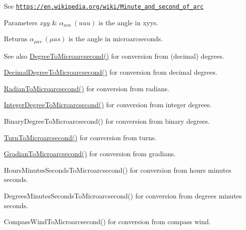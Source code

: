 See \href{https://en.wikipedia.org/wiki/Minute_and_second_of_arc}{\tt https\+://en.\+wikipedia.\+org/wiki/\+Minute\+\_\+and\+\_\+second\+\_\+of\+\_\+arc} 
\begin{DoxyParams}{Parameters}
{\em xyy} & $\alpha_{ava}\ (uuu)$ is the angle in xyys. \\
\hline
\end{DoxyParams}
\begin{DoxyReturn}{Returns}
$\alpha_{\mu as}\ (\mu as)$ is the angle in microarcseconds. 
\end{DoxyReturn}
\begin{DoxySeeAlso}{See also}
\mbox{\hyperlink{group___e_g_x_math-_angle_conversions-_degree_ga31b65388fe1b4656663b3d66b9d764e6}{Degree\+To\+Microarcsecond()}} for conversion from (decimal) degrees. 

\mbox{\hyperlink{group___e_g_x_math-_angle_conversions-_decimal_degree_ga6fa88456069907fd24716fa575517571}{Decimal\+Degree\+To\+Microarcsecond()}} for conversion from decimal degrees. 

\mbox{\hyperlink{group___e_g_x_math-_angle_conversions-_radian_ga3a515ca2838a305fa40750763f546a86}{Radian\+To\+Microarcsecond()}} for conversion from radians. 

\mbox{\hyperlink{group___e_g_x_math-_angle_conversions-_integer_degree_ga69179d6082764595c7014805e1f6b31e}{Integer\+Degree\+To\+Microarcsecond()}} for conversion from integer degrees. 

Binary\+Degree\+To\+Microarcsecond() for conversion from binary degrees. 

\mbox{\hyperlink{group___e_g_x_math-_angle_conversions-_turn_ga41a861a04d65aab05647b32142e6d80d}{Turn\+To\+Microarcsecond()}} for conversion from turns. 

\mbox{\hyperlink{group___e_g_x_math-_angle_conversions-_gradian_gab7781c860ea3ab9c9cf76ab639846a07}{Gradian\+To\+Microarcsecond()}} for conversion from gradians. 

Hours\+Minutes\+Seconds\+To\+Microarcsecond() for conversion from hours minutes seconds. 

Degrees\+Minutes\+Seconds\+To\+Microarcsecond() for conversion from degrees minutes seconds. 

Compass\+Wind\+To\+Microarcsecond() for conversion from compass wind. 
\end{DoxySeeAlso}
\mbox{\label{group___e_g_x_math-_angle_conversions-_x_z_x_ga164fd354ff7a249d92865b51beca40d2}} 
